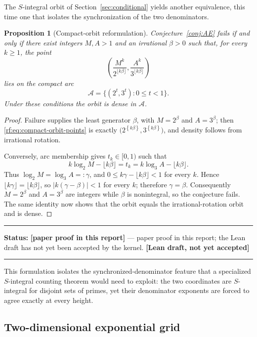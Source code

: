 \documentclass[11pt,oneside]{article}
\newtheorem{proposition}[theorem]{Proposition}
\theoremstyle{definition}
\theoremstyle{remark}
\newcommand{\fract}[1]{\left\{#1\right\}}
\newcommand{\lean}[1]{\texttt{\detokenize{#1}}}
\newcommand{\statusnew}{\textcolor{newgreen}{\textbf{[paper proof in this report]}}}
\newcommand{\statusdraft}{\textcolor{computeviolet}{\textbf{[Lean draft, not yet accepted]}}}
\newenvironment{statusbox}[1]
{\begin{center}\begin{minipage}{0.94\textwidth}\raggedright\hbadness=10000\hrule
\vspace{0.45em}\textbf{Status:} #1\par\vspace{0.35em}}
{\vspace{0.35em}\hrule\end{minipage}\end{center}}
\begin{document}
The $S$-integral orbit of Section~\ref{sec:conditional} yields another equivalence, this time
one that isolates the synchronization of the two denominators.

\begin{proposition}[Compact-orbit reformulation]
\label{rf:prop:compact-orbit}
Conjecture~\ref{conj:AE} fails if and only if there exist integers $M,A>1$ and an irrational
$\beta>0$ such that, for every $k\ge1$, the point
\begin{equation}
 \left(
  \frac{M^k}{2^{\lfloor k\beta\rfloor}},
  \frac{A^k}{3^{\lfloor k\beta\rfloor}}
 \right)
 \label{rf:eq:compact-orbit-points}
\end{equation}
lies on the compact arc
\[
 \mathcal A=\{(2^t,3^t):0\le t<1\}.
\]
Under these conditions the orbit is dense in $\mathcal A$.
\end{proposition}

\begin{proof}
Failure supplies the least generator $\beta$, with $M=2^\beta$ and $A=3^\beta$; then
\eqref{rf:eq:compact-orbit-points} is exactly
$\bigl(2^{\fract{k\beta}},3^{\fract{k\beta}}\bigr)$, and density follows from irrational
rotation.

Conversely, arc membership gives $t_k\in[0,1)$ such that
\[
 k\log_2M-\lfloor k\beta\rfloor=t_k
 =k\log_3A-\lfloor k\beta\rfloor.
\]
Thus $\log_2M=\log_3A=:\gamma$, and $0\le k\gamma-\lfloor k\beta\rfloor<1$ for every $k$.
Hence $\lfloor k\gamma\rfloor=\lfloor k\beta\rfloor$, so $|k(\gamma-\beta)|<1$ for every $k$;
therefore $\gamma=\beta$.  Consequently $M=2^\beta$ and $A=3^\beta$ are integers while $\beta$
is nonintegral, so the conjecture fails.  The same identity now shows that the orbit equals
the irrational-rotation orbit and is dense.
\end{proof}

\begin{statusbox}{\statusnew{} --- paper proof in this report; the Lean draft
\lean{CompactOrbit} has not yet been accepted by the kernel.  \statusdraft}
\end{statusbox}

This formulation isolates the synchronized-denominator feature that a specialized
$S$-integral counting theorem would need to exploit: the two coordinates are $S$-integral for
disjoint sets of primes, yet their denominator exponents are forced to agree exactly at every
height.

\subsection{Two-dimensional exponential grid}
\end{document}
